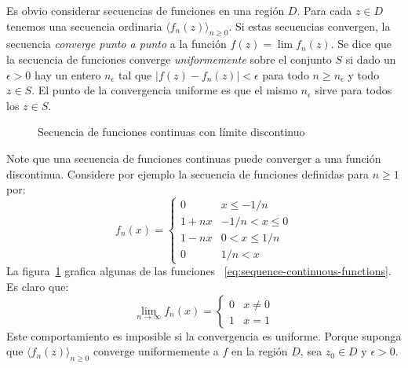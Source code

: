   Es obvio considerar secuencias de funciones en una región \(D\).
  Para cada \(z \in D\) tenemos una secuencia ordinaria
  \(\langle f_n(z) \rangle_{n \ge 0}\).
  Si estas secuencias convergen,
  la secuencia \emph{converge punto a punto}%
  a la función \(f(z) = \lim f_n(z)\).
  Se dice que la secuencia de funciones
  converge \emph{uniformemente}%
  sobre el conjunto \(S\) si dado un \(\epsilon > 0\)
  hay un entero \(n_\epsilon\)
  tal que \(\lvert f(z) - f_n(z) \rvert < \epsilon\)
  para todo \(n \ge n_\epsilon\) y todo \(z \in S\).
  El punto de la convergencia uniforme
  es que el mismo \(n_\epsilon\) sirve para todos los \(z \in S\).

  \begin{figure}[ht]
    \centering
    \caption{Secuencia de funciones continuas con límite discontinuo}
    \label{fig:sequence-continuous-limit-discontinuous}
  \end{figure}
  Note que una secuencia de funciones continuas
  puede converger a una función discontinua.
  Considere por ejemplo la secuencia de funciones
  definidas para \(n \ge 1\) por:
  \begin{equation}
    \label{eq:sequence-continuous-functions}
    f_n(x)
      = \begin{cases}
	  0	    & x \le - 1 / n \\
	  1 + n x   & -1 / n < x \le 0 \\
	  1 - n x   & 0 < x \le 1 / n \\
	  0	    & 1 / n < x
	\end{cases}
  \end{equation}
  La figura~\ref{fig:sequence-continuous-limit-discontinuous}
  grafica algunas de las funciones~%
    \eqref{eq:sequence-continuous-functions}.
  Es claro que:
  \begin{equation}
    \label{eq:continuous-functions-discontinuous-limit}
    \lim_{n \rightarrow \infty} f_n(x)
      = \begin{cases}
	  0  & x \ne 0 \\
	  1  & x = 1
	\end{cases}
  \end{equation}
  Este comportamiento es imposible si la convergencia es uniforme.
  Porque suponga que \(\langle f_n(z) \rangle_{n \ge 0}\)
  converge uniformemente a \(f\) en la región \(D\),
  sea \(z_0 \in D\) y \(\epsilon > 0\).
